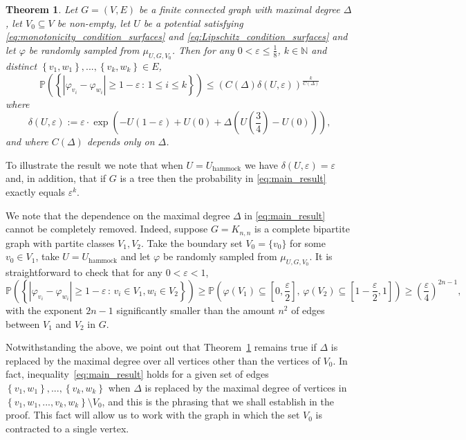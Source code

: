 \documentclass[english]{article}
\newtheorem{theorem}[counter]{Theorem}
\theoremstyle{plain}
\theoremstyle{plain}
\begin{document}
\begin{theorem}\label{main_thm}
Let $G=(V,E)$ be a finite connected graph with maximal degree $\Delta$,
let $V_0\subseteq V$ be non-empty, let $U$ be a potential satisfying
\eqref{eq:monotonicity_condition_surfaces} and
\eqref{eq:Lipschitz_condition_surfaces} and let $\varphi$ be
randomly sampled from $\mu_{U,G,V_{0}}$. Then for any
$0<\varepsilon\le \frac{1}{8}$, $k\in\mathbb{N}$ and distinct
$\left\{ v_{1},w_{1}\right\} ,...,\left\{ v_{k},w_{k}\right\} \in
E$,
\begin{equation}\label{eq:main_result}
\mathbb{P}\left(\left\{
\left|\varphi_{v_{i}}-\varphi_{w_{i}}\right|\ge
1-\varepsilon\,:\,1\leq i\leq k\right\}
\right)\le\left(C(\Delta)\delta(U,\varepsilon)\right)^\frac{k}{C(\Delta)}
\end{equation}
where
\begin{equation*}
  \delta(U, \varepsilon):=\varepsilon\cdot \exp\left(-U(1-\varepsilon)+U(0)+\Delta\left(U\left(\frac{3}{4}\right) - U(0)\right)\right),
\end{equation*}
and where $C(\Delta)$ depends only on $\Delta$.
\end{theorem}
To illustrate the result we note that when $U = U_{\text{hammock}}$
we have $\delta(U, \varepsilon) = \varepsilon$ and, in addition,
that if $G$ is a tree then the probability in \eqref{eq:main_result}
exactly equals $\varepsilon^k$.

We note that the dependence on the maximal degree $\Delta$ in
\eqref{eq:main_result} cannot be completely removed. Indeed, suppose
$G = K_{n,n}$ is a complete bipartite graph with partite classes
$V_1, V_2$. Take the boundary set $V_0 = \{v_0\}$ for some $v_0\in
V_1$, take $U = U_{\text{hammock}}$ and let $\varphi$ be randomly
sampled from $\mu_{U,G,V_{0}}$. It is straightforward to check that
for any $0<\varepsilon<1$,
\begin{equation*}
  \mathbb{P}\left(\left\{
\left|\varphi_{v_{i}}-\varphi_{w_{i}}\right|\ge
1-\varepsilon\,:\,v_i\in V_1, w_i\in V_2\right\} \right)\ge
\mathbb{P}\left(\varphi(V_1)\subseteq\left[0,\frac{\varepsilon}{2}\right],\,
\varphi(V_2)\subseteq
\left[1-\frac{\varepsilon}{2},1\right]\right)\ge \left(\frac{\varepsilon}{4}\right)^{2n-1},
\end{equation*}
with the exponent $2n-1$ significantly smaller than the amount $n^2$
of edges between $V_1$ and $V_2$ in $G$.

Notwithstanding the above, we point out that Theorem~\ref{main_thm}
remains true if $\Delta$ is replaced by the maximal degree over all
vertices other than the vertices of $V_0$. In fact,
inequality~\eqref{eq:main_result} holds for a given set of edges
$\left\{ v_{1},w_{1}\right\} ,...,\left\{ v_{k},w_{k}\right\}$ when
$\Delta$ is replaced by the maximal degree of vertices in $\left\{
v_{1},w_{1},...,v_{k},w_{k}\right\}\setminus V_0$, and this is the
phrasing that we shall establish in the proof. This fact will allow
us to work with the graph in which the set $V_0$ is contracted to a
single vertex.
\end{document}
